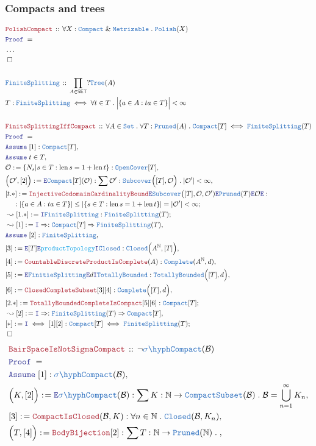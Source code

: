 \documentclass[12pt]{scrartcl}
\newcommand{\TYPE}[1]{\textcolor{NavyBlue}{\mathtt{#1}}}
\newcommand{\FUNC}[1]{\textcolor{Cerulean}{\mathtt{#1}}}
\newcommand{\LOGIC}[1]{\textcolor{Blue}{\mathtt{#1}}}
\newcommand{\THM}[1]{\textcolor{Maroon}{\mathtt{#1}}}
\renewcommand{\.}{\; . \;}
\newcommand{\de}{: \kern 0.1pc =}
\newcommand{\Theorem}[2]{& \THM{#1} \, :: \, #2 \\ & \Proof = \\ }
\newcommand{\DeclareType}[2]{& \TYPE{#1} \, :: \, #2 \\}
\newcommand{\DefineType}[3]{& #1 : \TYPE{#2} \iff #3 \\}
\newcommand{\NewLine}{\\ & \kern 1pc}
\newcommand{\Page}[1]{ \begin{align*} #1 \end{align*}   }
\newcommand{\NoProof}{ & \ldots \\ \EndProof}
\renewcommand{\And}{\; \& \;}
\newcommand{\Imply}{\Rightarrow}
\newcommand{\Intro}{\LOGIC{I}}
\newcommand{\Elim}{\LOGIC{E}}
\newcommand{\Nat}{\mathbb{N} }
\newcommand{\Set}{\TYPE{Set}}
\newcommand{\Say}[3]{& #1 \de #2 : #3, \\}
\newcommand{\Conclude}[3]{& #1 \de #2 : #3; \\}
\newcommand{\Derive}[3]{& \leadsto #1 \de #2 : #3, \\}
\newcommand{\DeriveConclude}[3]{& \leadsto #1 \de #2 : #3 ; \\}
\newcommand{\Assume}[2]{& \LOGIC{Assume} \; #1 : #2, \\}
\newcommand{\AssumeIn}[2]{& \LOGIC{Assume} \; #1 \in #2, \\}
\newcommand{\QED}{\; \square}
\newcommand{\EndProof}{& \QED \\}
\newcommand{\Proof}{\LOGIC{Proof} \; }
\newcommand{\B}{\mathcal{B}}
\newcommand{\SET}{\mathsf{SET}}
\newcommand{\Compact}{\TYPE{Compact}}
\newcommand{\Compacts}{\TYPE{CompactSubset}}
\newcommand{\SCompact}{\TYPE{\sigma\hyph Compact}}
\renewcommand{\O}{\mathcal{O}}
\newcommand{\Tree}{\TYPE{Tree}}
\newcommand{\Polish}{\TYPE{Polish}}
\DeclareMathOperator{\len}{len}
\begin{document}
\subsubsection{Compacts and trees}
\Page{
	\Theorem{PolishCompact}
	{
		\forall X : \TYPE{Compact} \And \TYPE{Metrizable} \.
		\Polish(X)
	}
	\NoProof
	\\
	\DeclareType{FiniteSplitting}{\prod_{A \in \SET}? \Tree(A)}
	\DefineType{T}{FiniteSplitting}
	{
		\forall t \in T \. 
		\Big|\{a \in A : ta \in T \}\Big| < \infty
	}
	\\
	\Theorem{FiniteSplittingIffCompact}
	{
		\forall A \in \Set \.
		\forall T : \TYPE{Pruned}(A) \.
		\TYPE{Compact}[T] \iff \TYPE{FiniteSplitting}(T)
	}
	\Assume{[1]}{\TYPE{Compact}[T]}
	\AssumeIn{t}{T}
	\Say{\mathcal{O}}{\{ N_s | s \in T : \len s = 1 + \len t \}}{\TYPE{OpenCover}[T]}
	\Say{\Big(\mathcal{O}',[2]\Big)}
	{
		\Elim \TYPE{Compact}[T](\mathcal{O})
	}
	{
		\sum \mathcal{O}' : \TYPE{Subcover}\Big([T],\mathcal{O}\Big) \. |\mathcal{O}'| < \infty
	}
	\Conclude{[t.*]}{\THM{InjectiveCodomainCardinalityBound}\Elim \TYPE{Subcover}\big([T],\O,\O') \Elim \TYPE{Pruned}(T) \Elim \O \Elim }
	{
		\NewLine : 
		| \{ a \in A : ta \in T \} | \le
		|\{ s \in T :  \len s = 1 + \len t  \}| = 
		|\O'| 
		< \infty 
	}
	\DeriveConclude{[1.*]}{ \Intro \TYPE{FiniteSplitting}  }
	{
		\TYPE{FiniteSplitting}(T)
	}
	\Derive{[1]}{\Intro \Imply}
	{
		\Compact[T]
		\Imply
		\TYPE{FiniteSplitting}(T)
	}
	\Assume{[2]}{\TYPE{FiniteSplitting}}
	\Say{[3]}{\Elim [T]\Elim \FUNC{productTopology}\Intro \TYPE{Closed}}{\TYPE{Closed}\Big(A^\Nat,[T]\Big)}
	\Say{[4]}{\THM{CountableDiscreteProductIsComplete}(A)}
	{
		\TYPE{Complete}(A^\Nat,d)
	}
	\Say{[5]}{\Elim \TYPE{FinitieSplitting} \Elim d \Intro \TYPE{TotallyBounded}}
	{
		\TYPE{TotallyBounded}\Big(  [T], d \Big)
	}
	\Say{[6]}{\THM{ClosedCompleteSubset}[3][4]}{\TYPE{Complete}\Big( [T],d\Big)}
	\Conclude{[2.*]}{\THM{TotallyBoundedCompleteIsCompact}[5][6]}
	{
		\TYPE{Compact}[T]
	}
	\Derive{[2]}{\Intro \Imply}
	{
		\TYPE{FiniteSplitting}(T)
		\Imply
		\TYPE{Compact}[T]
	}
	\Conclude{[*]}
	{
		\Intro \iff [1][2]
	}
	{
		\TYPE{Compact}[T]
		\iff
		\TYPE{FiniteSplitting}(T)
	}
	\EndProof
}\Page{
	\Theorem{BairSpaceIsNotSigmaCompact}{\neg \TYPE{\sigma\hyph}\Compact(\B)}
	\Assume{[1]}{\SCompact(\B)}
	\Say{\Big(K,[2]\Big)}{\Elim \SCompact(\B)}
	{
		\sum K : \Nat \to \Compacts(\B) \. \B = \bigcup^\infty_{n=1} K_n
	}
	\Say{[3]}{\THM{CompactIsClosed}(\B,K)}
	{
		\forall n \in \Nat \. \TYPE{Closed}(\B,K_n)
	}
	\Say{\Big(T,[4]\Big)}
	{
		\THM{BodyBijection}[2]
	}
	{
		\sum T : \Nat \to \TYPE{Pruned}(\Nat) \.
}}
\end{document}
